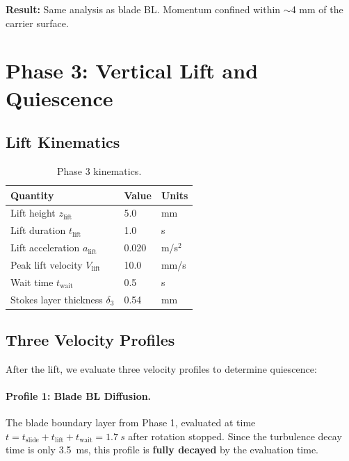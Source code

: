 \documentclass[11pt,a4paper]{article}
\begin{document}
\textbf{Result:} Same analysis as blade BL. Momentum confined within
$\sim$4 mm of the carrier surface.


\section{Phase 3: Vertical Lift and Quiescence}
\label{sec:phase3}

\subsection{Lift Kinematics}

\begin{table}[H]
\centering
\caption{Phase 3 kinematics.}
\label{tab:phase3_kin}
\begin{tabular}{lll}
\toprule
Quantity & Value & Units \\
\midrule
Lift height $z_\mathrm{lift}$ & 5.0 & mm \\
Lift duration $t_\mathrm{lift}$ & 1.0 & s \\
Lift acceleration $a_\mathrm{lift}$ & 0.020 & m/s$^2$ \\
Peak lift velocity $V_\mathrm{lift}$ & 10.0 & mm/s \\
Wait time $t_\mathrm{wait}$ & 0.5 & s \\
Stokes layer thickness $\delta_3$ & 0.54 & mm \\
\bottomrule
\end{tabular}
\end{table}

\subsection{Three Velocity Profiles}

After the lift, we evaluate three velocity profiles to determine quiescence:

\paragraph{Profile 1: Blade BL Diffusion.}
The blade boundary layer from Phase 1, evaluated at time
$t = t_\mathrm{slide} + t_\mathrm{lift} + t_\mathrm{wait} = \SI{1.7}{s}$
after rotation stopped. Since the turbulence decay time is only \SI{3.5}{ms},
this profile is \textbf{fully decayed} by the evaluation time.
\end{document}
